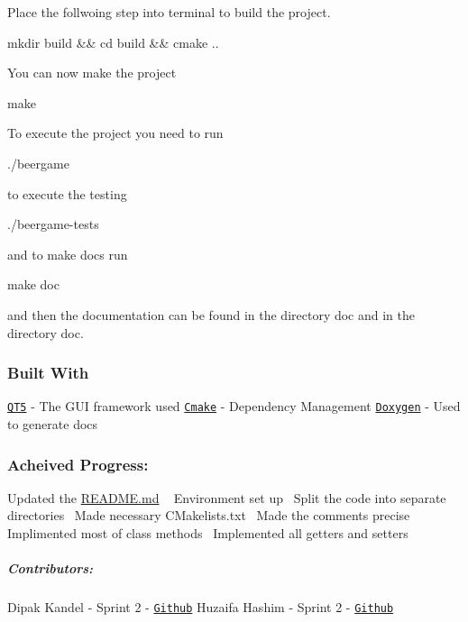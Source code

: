 Place the follwoing step into terminal to build the project. 
\begin{DoxyCode}
mkdir build && cd build && cmake ..
\end{DoxyCode}
 You can now make the project 
\begin{DoxyCode}
make
\end{DoxyCode}
 To execute the project you need to run 
\begin{DoxyCode}
./beergame
\end{DoxyCode}
 to execute the testing 
\begin{DoxyCode}
./beergame-tests
\end{DoxyCode}
 and to make docs run 
\begin{DoxyCode}
make doc
\end{DoxyCode}
 and then the documentation can be found in the directory doc and in the directory doc.

\subsubsection*{Built With}

\href{https://www.qt.io/}{\tt Q\+T5} -\/ The G\+UI framework used \href{https://cmake.org/}{\tt Cmake} -\/ Dependency Management \href{http://www.doxygen.nl/}{\tt Doxygen} -\/ Used to generate docs

\subsubsection*{Acheived Progress\+:}

Updated the \hyperlink{_r_e_a_d_m_e_8md}{R\+E\+A\+D\+M\+E.\+md} ~\newline
 Environment set up~\newline
 Split the code into separate directories~\newline
 Made necessary C\+Makelists.\+txt~\newline
 Made the comments precise~\newline
 Implimented most of class methods~\newline
 Implemented all getters and setters~\newline


\subparagraph*{Contributors\+:}

Dipak Kandel -\/ Sprint 2 -\/ \href{https://github.com/kandeldipak06}{\tt Github} Huzaifa Hashim -\/ Sprint 2 -\/ \href{https://github.com/hhashim2}{\tt Github} 